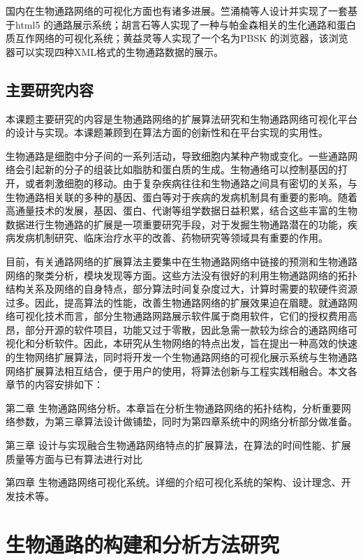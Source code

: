 国内在生物通路网络的可视化方面也有诸多进展。竺涌楠\cite{zhu2015}等人设计并实现了一套基于html5 的通路展示系统；胡言石\cite{huyanshi}等人实现了一种与帕金森相关的生化通路和蛋白质互作网络的可视化系统；黄益灵\cite{huang2011PBSK}等人实现了一个名为PBSK 的浏览器，该浏览器可以实现四种XML格式的生物通路数据的展示。

\section{主要研究内容}
本课题主要研究的内容是生物通路网络的扩展算法研究和生物通路网络可视化平台的设计与实现。本课题兼顾到在算法方面的创新性和在平台实现的实用性。

生物通路是细胞中分子间的一系列活动，导致细胞内某种产物或变化。一些通路网络会引起新的分子的组装比如脂肪和蛋白质的生成。生物通络可以控制基因的打开，或者刺激细胞的移动。由于复杂疾病往往和生物通路之间具有密切的关系，与生物通路相关联的多种的基因、蛋白等对于疾病的发病机制具有重要的影响。随着高通量技术的发展，基因、蛋白、代谢等组学数据日益积累，结合这些丰富的生物数据进行生物通路的扩展是一项重要研究手段，对于发掘生物通路潜在的功能，疾病发病机制研究、临床治疗水平的改善、药物研究等领域具有重要的作用。

目前，有关通路网络的扩展算法主要集中在生物通路网络中链接的预测和生物通路网络的聚类分析，模块发现等方面。这些方法没有很好的利用生物通路网络的拓扑结构关系及网络的自身特点，部分算法时间复杂度过大，计算时需要的软硬件资源过多。因此，提高算法的性能，改善生物通路网络的扩展效果迫在眉睫。就通路网络可视化技术而言，部分生物通路网路展示软件属于商用软件，它们的授权费用高昂，部分开源的软件项目，功能又过于零散，因此急需一款较为综合的通路网络可视化和分析软件。因此，本研究从生物网络的特点出发，旨在提出一种高效的快速的生物网络扩展算法，同时将开发一个生物通路网络的可视化展示系统与生物通路网络扩展算法相互结合，便于用户的使用，将算法创新与工程实践相融合。本文各章节的内容安排如下：

第二章 生物通路网络分析。本章旨在分析生物通路网络的拓扑结构，分析重要网络参数，为第三章算法设计做铺垫，同时为第四章系统中的网络分析部分做准备。

第三章 设计与实现融合生物通路网络特点的扩展算法，在算法的时间性能、扩展质量等方面与已有算法进行对比

第四章 生物通路网络可视化系统。详细的介绍可视化系统的架构、设计理念、开发技术等。


\chapter{生物通路的构建和分析方法研究}
